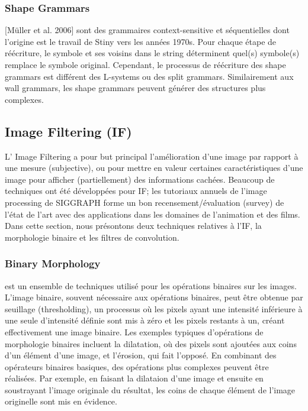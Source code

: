 \documentclass[11pt]{report}
\begin{document}
\subsubsection{Shape Grammars} [Müller et al. 2006] sont des grammaires context-sensitive et séquentielles dont l'origine est le travail de Stiny vers les années 1970s. Pour chaque étape de réécriture, le symbole et ses voisins dans le string déterminent quel(s) symbole(s) remplace le symbole original. Cependant, le processus de réécriture des shape grammars est différent des L-systems ou des split grammars. Similairement aux wall grammars, les shape grammars peuvent générer des structures plus complexes.

\subsection{Image Filtering (IF)} L' Image Filtering a pour but principal l'amélioration d'une image par rapport à une mesure (subjective), ou pour mettre en valeur certaines caractéristiques d'une image pour afficher (partiellement) des informations cachées. Beaucoup de techniques ont été développées pour IF; les tutoriaux annuels de l'image processing de SIGGRAPH forme un bon recensement/évaluation (survey) de l'état de l'art avec des applications dans les domaines de l'animation et des films. Dans cette section, nous présontons deux techniques relatives à l'IF, la morphologie binaire et les filtres de convolution.

\subsubsection{Binary Morphology} est un ensemble de techniques utilisé pour les opérations binaires sur les images. L'image binaire, souvent nécessaire aux opérations binaires, peut être obtenue par seuillage (thresholding), un processus où les pixels ayant une intensité inférieure à une seule d'intensité définie sont mis à zéro et les pixels restants à un, créant effectivement une image binaire. Les exemples typiques d'opérations de morphologie binaires incluent la dilatation, où des pixels sont ajoutées aux coins d'un élément d'une image, et l'érosion, qui fait l'opposé. En combinant des opérateurs binaires basiques, des opérations plus complexes peuvent être réalisées. Par exemple, en faisant la dilataion d'une image et ensuite en soustrayant l'image originale du résultat, les coins de chaque élément de l'image originelle sont mis en évidence.
\end{document}
